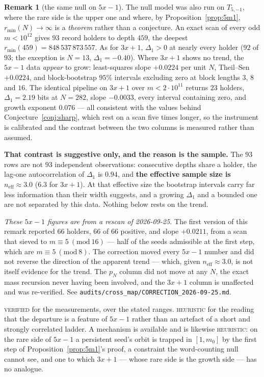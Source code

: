 \documentclass[11pt,reqno]{amsart}
\theoremstyle{plain}
\theoremstyle{definition}
\newtheorem{remark}[theorem]{Remark}
\newcommand{\lab}[1]{\textnormal{\textsc{\small #1}}}
\begin{document}
\begin{remark}[the same null on $5x-1$]\label{rem:null5}
The null model was also run on $T_{5,-1}$, where the rare side is the upper one
and where, by Proposition~\ref{prop:5m1}, $r_{\min}(N)\to\infty$ is a
\emph{theorem} rather than a conjecture. An exact scan of every odd $m<10^{12}$
gives $93$ record holders to depth $459$, the deepest
$r_{\min}(459)=848\,537\,873\,557$. As for $3x+1$, $\Delta_1>0$ at nearly every
holder ($92$ of $93$; the exception is $N=13$, $\Delta_1=-0.40$). Where $3x+1$
shows no trend, the $5x-1$ data \emph{appear} to grow: least-squares slope
$+0.0224$ per unit $N$, Theil--Sen $+0.0224$, and block-bootstrap $95\%$ intervals
excluding zero at block lengths $3$, $8$ and $16$. The identical pipeline on
$3x+1$ over $m<2\cdot10^{11}$ returns $23$ holders, $\Delta_1=2.19$ bits at
$N=282$, slope $-0.0033$, every interval containing zero, and growth exponent
$0.076$ --- all consistent with the values behind Conjecture~\ref{conj:sharp},
which rest on a scan five times longer, so the instrument is calibrated and the
contrast between the two columns is measured rather than assumed.

\textbf{That contrast is suggestive only, and the reason is the sample.} The
$93$ rows are not $93$ independent observations: consecutive depths share a
holder, the lag-one autocorrelation of $\Delta_1$ is $0.94$, and
\textbf{the effective sample size is $n_{\mathrm{eff}}\approx3.0$} ($6.3$ for
$3x+1$). At that effective size the bootstrap intervals carry far less
information than their width suggests, and a growing $\Delta_1$ and a bounded one
are not separated by this data. Nothing below rests on the trend.

\emph{These $5x-1$ figures are from a rescan of 2026-09-25.} The first version of
this remark reported $66$ holders, $66$ of $66$ positive, and slope $+0.0211$,
from a scan that sieved to $m\equiv5\ (\mathrm{mod}\ 16)$ --- half of the seeds
admissible at the first step, which are $m\equiv5\ (\mathrm{mod}\ 8)$. The
correction moved every $5x-1$ number and did not reverse the direction of the
apparent trend --- which, given $n_{\mathrm{eff}}\approx3.0$, is not itself
evidence for the trend. The $p_N$ column did not move at any $N$, the exact mass
recursion never having been involved, and the $3x+1$ column is unaffected and was
re-verified. See \texttt{audits/cross\_map/CORRECTION\_2026-09-25.md}.
\end{remark}
\lab{verified} for the measurements, over the stated ranges. \lab{heuristic} for
the reading that the departure is a feature of $5x-1$ rather than an artefact of a
short and strongly correlated ladder. A mechanism is available and is likewise
\lab{heuristic}: on the rare side of $5x-1$ a persistent seed's orbit is trapped in
$[1,m_0]$ by the first step of Proposition~\ref{prop:5m1}'s proof, a constraint the
word-counting null cannot see, and one to which $3x+1$ --- whose rare side is the
growth side --- has no analogue.
\end{document}

